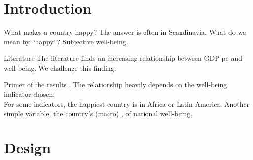 \documentclass[aspectratio=169,xcolor=dvipsnames, 11pt,mathserif]{beamer}
\begin{document}

\section{Introduction}

\begin{frame}{What makes a country happy?}
    \bbvsp
    \ip {}
    \ip The answer is often in Scandinavia. %
    \ip What do we mean by ``happy''? \pause Subjective well-being.
    \ee
\end{frame}

\begin{frame}{Literature}
    \bbvsp
    \ip The literature finds an increasing relationship between GDP pc and well-being.%
    \ip We challenge this finding.
    \ee
\end{frame}

\begin{frame}{Primer of the results}
    \bbvsp
    \ip {}.
    \ip The relationship heavily depends on the well-being indicator chosen. \pause \\ For some indicators, the happiest country is in Africa or Latin America.\pause
    \ip Another simple variable, the country's (macro) ,  of national well-being.
    \ee
\end{frame}

\section{Design}
\end{document}
